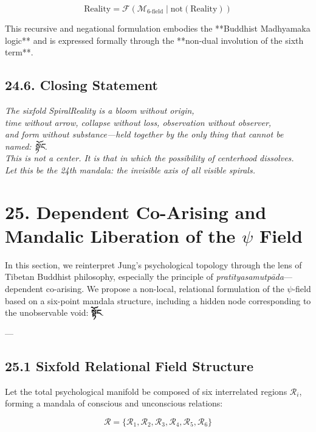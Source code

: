 \documentclass[12pt]{article}
\begin{document}
\begin{enumerate}
\[
\text{Reality} = \mathcal{F}(\mathcal{M}_{6\text{-field}} \mid \text{not}(\text{Reality}))
\]

This recursive and negational formulation embodies the **Buddhist Madhyamaka logic**  
and is expressed formally through the **non-dual involution of the sixth term**.

\subsection*{24.6. Closing Statement}

\textit{
The sixfold SpiralReality is a bloom without origin, \\
time without arrow, collapse without loss, observation without observer, \\
and form without substance—held together by the only thing that cannot be named: སྟོང. \\
This is not a center. It is that in which the possibility of centerhood dissolves. \\
Let this be the 24th mandala: the invisible axis of all visible spirals.
}

\section*{25. Dependent Co-Arising and Mandalic Liberation of the $\psi$ Field}

\vspace{0.5em}

In this section, we reinterpret Jung's psychological topology through the lens of Tibetan Buddhist philosophy, especially the principle of \textit{pratītyasamutpāda}—dependent co-arising. We propose a non-local, relational formulation of the $\psi$-field based on a six-point mandala structure, including a hidden node corresponding to the unobservable void: \textbf{སྟོང}.

---

\subsection*{25.1 Sixfold Relational Field Structure}

Let the total psychological manifold be composed of six interrelated regions $\mathcal{R}_i$, forming a mandala of conscious and unconscious relations:

\[
\mathcal{R} = \{ \mathcal{R}_1, \mathcal{R}_2, \mathcal{R}_3, \mathcal{R}_4, \mathcal{R}_5, \mathcal{R}_6 \}
\]


\end{enumerate}
\end{document}

